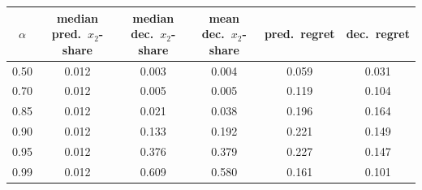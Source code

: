 \begin{tabular}{cccccc}
\toprule
$\alpha$ & median pred.\ $x_2$-share & median dec.\ $x_2$-share & mean dec.\ $x_2$-share & pred.\ regret & dec.\ regret \\
\midrule
0.50 & 0.012 & 0.003 & 0.004 & 0.059 & 0.031 \\
0.70 & 0.012 & 0.005 & 0.005 & 0.119 & 0.104 \\
0.85 & 0.012 & 0.021 & 0.038 & 0.196 & 0.164 \\
0.90 & 0.012 & 0.133 & 0.192 & 0.221 & 0.149 \\
0.95 & 0.012 & 0.376 & 0.379 & 0.227 & 0.147 \\
0.99 & 0.012 & 0.609 & 0.580 & 0.161 & 0.101 \\
\bottomrule
\end{tabular}